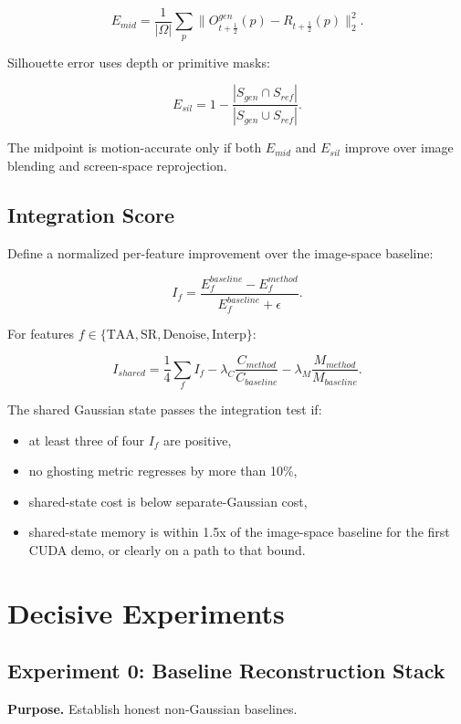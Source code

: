 \documentclass[11pt]{article}
\begin{document}
\[
  E_{mid} =
  \frac{1}{|\Omega|}
  \sum_p
  \|O_{t+\frac{1}{2}}^{gen}(p)-R_{t+\frac{1}{2}}(p)\|_2^2.
\]

Silhouette error uses depth or primitive masks:

\[
  E_{sil} =
  1 -
  \frac{|S_{gen}\cap S_{ref}|}{|S_{gen}\cup S_{ref}|}.
\]

The midpoint is motion-accurate only if both $E_{mid}$ and $E_{sil}$ improve
over image blending and screen-space reprojection.

\subsection{Integration Score}

Define a normalized per-feature improvement over the image-space baseline:

\[
  I_f =
  \frac{E_f^{baseline}-E_f^{method}}
       {E_f^{baseline}+\epsilon}.
\]

For features $f\in\{\mathrm{TAA},\mathrm{SR},\mathrm{Denoise},\mathrm{Interp}\}$:

\[
  I_{shared} =
  \frac{1}{4}\sum_f I_f
  - \lambda_C\frac{C_{method}}{C_{baseline}}
  - \lambda_M\frac{M_{method}}{M_{baseline}}.
\]

The shared Gaussian state passes the integration test if:

\begin{itemize}
  \item at least three of four $I_f$ are positive,
  \item no ghosting metric regresses by more than 10\%,
  \item shared-state cost is below separate-Gaussian cost,
  \item shared-state memory is within 1.5x of the image-space baseline for the
        first CUDA demo, or clearly on a path to that bound.
\end{itemize}

\section{Decisive Experiments}

\subsection{Experiment 0: Baseline Reconstruction Stack}

\textbf{Purpose.} Establish honest non-Gaussian baselines.
\end{document}
